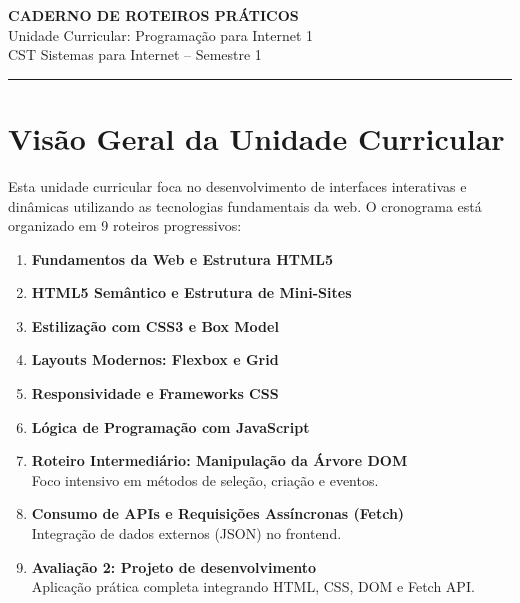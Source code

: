 \documentclass[12pt,a4paper]{article}
\begin{document}
\begin{center}
    {\Large \textbf{CADERNO DE ROTEIROS PRÁTICOS}}\\
    Unidade Curricular: Programação para Internet 1\\
    CST Sistemas para Internet -- Semestre 1
\end{center}

\vspace{0.5cm}
\hrule
\vspace{0.8cm}

\tableofcontents
\newpage

\section{Visão Geral da Unidade Curricular}

Esta unidade curricular foca no desenvolvimento de interfaces interativas e dinâmicas utilizando as tecnologias fundamentais da web. O cronograma está organizado em 9 roteiros progressivos:

\begin{enumerate}
    \item \textbf{Fundamentos da Web e Estrutura HTML5}
    \item \textbf{HTML5 Semântico e Estrutura de Mini-Sites}
    \item \textbf{Estilização com CSS3 e Box Model}
    \item \textbf{Layouts Modernos: Flexbox e Grid}
    \item \textbf{Responsividade e Frameworks CSS}
    \item \textbf{Lógica de Programação com JavaScript}
    \item \textbf{Roteiro Intermediário: Manipulação da Árvore DOM} \\
    Foco intensivo em métodos de seleção, criação e eventos.
    \item \textbf{Consumo de APIs e Requisições Assíncronas (Fetch)} \\
    Integração de dados externos (JSON) no frontend.
    \item \textbf{Avaliação 2: Projeto de desenvolvimento} \\
    Aplicação prática completa integrando HTML, CSS, DOM e Fetch API.
\end{enumerate}

\newpage

\end{document}
